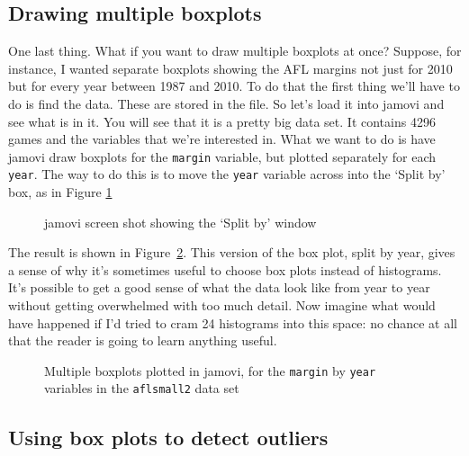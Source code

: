 \subsection{Drawing multiple boxplots~\label{sec:multipleboxplots}}

One last thing. What if you want to draw multiple boxplots at once? Suppose, for instance, I wanted separate boxplots showing the AFL margins not just for 2010 but for every year between 1987 and 2010. To do that the first thing we'll have to do is find the data. These are stored in the  file. So let's load it into jamovi and see what is in it. You will see that it is a pretty big data set. It contains 4296 games and the variables that we're interested in. What we want to do is have jamovi draw boxplots for the \texttt{margin} variable, but plotted separately for each  \texttt{year}. The way to do this is to move the \texttt{year} variable across into the `Split by' box, as in Figure \ref{fig:splitfile1}

\begin{figure}[!!htb]
\begin{center}
\caption{jamovi screen shot showing the `Split by' window}
\label{fig:splitfile1}
\end{center}
\end{figure}

The result is shown in Figure~\ref{fig:boxplot3}. This version of the box plot, split by year, gives a sense of why it's sometimes useful to choose box plots instead of histograms. It's possible to get a good sense of what the data look like from year to year without getting overwhelmed with too much detail. Now imagine what would have happened if I'd tried to cram 24 histograms into this space: no chance at all that the reader is going to learn anything useful.

\begin{figure}[!!htb]
\begin{center}
\caption{Multiple boxplots plotted in jamovi, for the \texttt{margin} by \texttt{year} variables in the \texttt{aflsmall2} data set}
\label{fig:boxplot3}
\end{center}
\end{figure}

\subsection{Using box plots to detect outliers~\label{sec:boxplotoutliers}}

